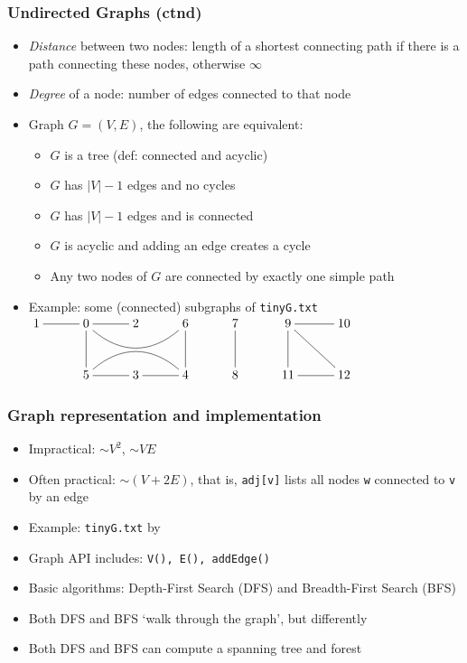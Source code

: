 \documentclass[handout]{beamer}
\newcommand{\git}{https://github.com/marcbezem/INF102/blob/master}
\begin{document}
\begin{frame}\label{tree_characteristics}
    \frametitle{Undirected Graphs (ctnd)}

\begin{itemize}[<+->]
\item\emph{Distance} between  two nodes: length of a shortest connecting path
if there is a path connecting these nodes, otherwise $\infty$
\item\emph{Degree} of a node: number of edges connected to that node
\item Graph $G=(V,E)$, the following are equivalent:
  \begin{itemize}
  \item $G$ is a tree (def: connected and acyclic)
  \item $G$ has $|V|-1$ edges and no cycles  
  \item $G$ has $|V|-1$ edges and is connected
  \item $G$ is acyclic and adding an edge creates a cycle
  \item Any two nodes of $G$ are connected by exactly one simple path
  \end{itemize}
\item Example: some (connected) subgraphs of {\tt tinyG.txt}
$\xymatrix@R=1cm@C=1cm{
1 & 0\ar@{-}[l]\ar@{-}[d]\ar@{-}[r]\ar@{-}@(dr,dl)[rr] &2 & 6 & 
7 \ar@{-}[d]& 9 \ar@{-}[d]\ar@{-}[rd] \ar@{-}[r]& 10\\
   & 5 \ar@{-}@(ur,ul)[rr] \ar@{-}[r] & 3  \ar@{-}[r] & 4   \ar@{-}[u] & 
8                   &  11\ar@{-}[r] & 12 }$
\end{itemize}
\end{frame}

\begin{frame}
    \frametitle{Graph representation and implementation}

\begin{itemize}[<+->]
\item Impractical: 
\href{https://en.wikipedia.org/wiki/Adjacency_matrix}%
{\color{red}{adjacency matrix}} ${\sim}V^2$, 
\href{https://en.wikipedia.org/wiki/Incidence_matrix}%
{\color{red}{incidence matrix}}  ${\sim}VE$
\item Often practical: 
\href{https://en.wikipedia.org/wiki/Adjacency_list}%
{\color{red}{adjacency lists}}  $\sim(V{+}2E)$, that is, 
{\tt adj[v]} lists all nodes {\tt w} connected to {\tt v} by an edge
\item Example: {\tt tinyG.txt} by 
\href{\git/programs/graphs/LinkedListG.java}%
{\color{red}{\tt LinkedListG.java}}
\item Graph API includes: {\tt V(), E(), addEdge()}
\item Basic algorithms: Depth-First Search (DFS) and Breadth-First Search (BFS)
\item Both DFS and BFS `walk through the graph', but differently
\item Both DFS and BFS can compute a spanning tree and forest
\end{itemize}
\end{frame}
\end{document}

